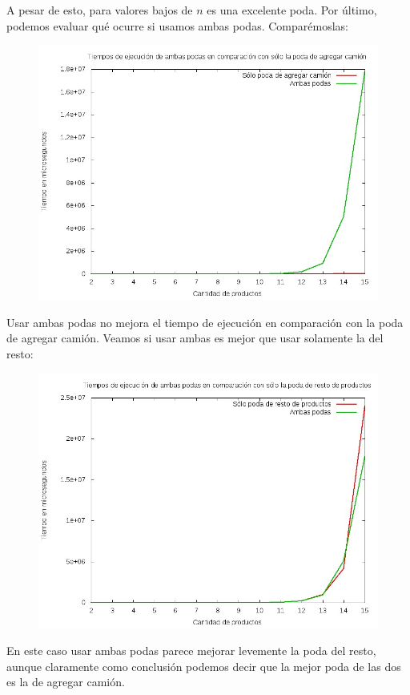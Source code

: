 A pesar de esto, para valores bajos de $n$ es una excelente poda. Por último, podemos evaluar qué ocurre si usamos ambas podas. Comparémoslas:

\begin{figure}[H]
	\begin{minipage}[t]{\linewidth}
		\centering
		\includegraphics[width=\textwidth]{comparacion_poda_camion_con_ambas_podas.jpg}
		\label{fig:p3_comparacion_poda_camion_con_ambas_podas}
	\end{minipage}
\end{figure}

Usar ambas podas no mejora el tiempo de ejecución en comparación con la poda de agregar camión. Veamos si usar ambas es mejor que usar solamente la del resto:

\begin{figure}[H]
	\begin{minipage}[t]{\linewidth}
		\centering
		\includegraphics[width=\textwidth]{comparacion_poda_resto_con_ambas_podas.jpg}
		\label{fig:p3_comparacion_poda_resto_con_ambas_podas}
	\end{minipage}
\end{figure}

En este caso usar ambas podas parece mejorar levemente la poda del resto, aunque claramente como conclusión podemos decir que la mejor poda de las dos es la de agregar camión.
